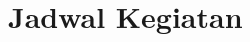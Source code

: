 \documentclass[12pt]{article}
\numberwithin{lemma}{subsection}
\begin{document}
\pagebreak
\section{Jadwal Kegiatan}
%	
\pagebreak
\end{document}

